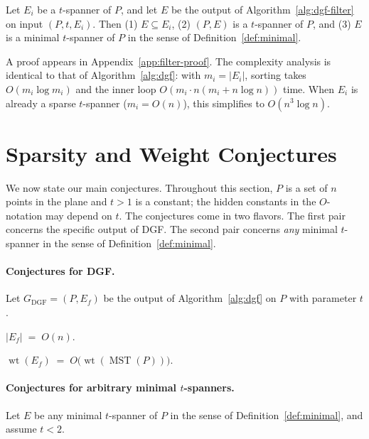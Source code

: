 \documentclass{cccg26}
\DeclareMathOperator{\wt}{wt}
\DeclareMathOperator{\MST}{MST}
\begin{document}
\begin{theorem}\label{thm:filter-minimal}
Let $E_i$ be a $t$-spanner of $P$, and let $E$ be the output of
Algorithm~\ref{alg:dgf-filter} on input $(P,t,E_i)$. Then
(1) $E \subseteq E_i$, (2) $(P,E)$ is a $t$-spanner of $P$, and
(3) $E$ is a minimal $t$-spanner of $P$ in the sense of
Definition~\ref{def:minimal}.
\end{theorem}

A proof appears in Appendix~\ref{app:filter-proof}. The complexity
analysis is identical to that of Algorithm~\ref{alg:dgf}: with
$m_i=|E_i|$, sorting takes $O(m_i\log m_i)$ and the inner loop
$O(m_i\cdot n(m_i+n\log n))$ time. When $E_i$ is already a sparse
$t$-spanner ($m_i=O(n)$), this simplifies to $O(n^3 \log n)$.

\section{Sparsity and Weight Conjectures}
\label{sec:conjectures}

We now state our main conjectures. Throughout this section, $P$ is a
set of $n$ points in the plane and $t>1$ is a constant; the hidden
constants in the $O$-notation may depend on $t$. The conjectures come
in two flavors. The first pair concerns the specific output of DGF.
The second pair concerns \emph{any} minimal $t$-spanner in the sense
of Definition~\ref{def:minimal}.

\paragraph{Conjectures for DGF.}
Let $G_{\mathrm{DGF}}=(P,E_f)$ be the output of Algorithm~\ref{alg:dgf}
on $P$ with parameter $t$.

\begin{conj}\label{conj:dgf-edges}
$|E_f| \;=\; O(n)$.
\end{conj}

\begin{conj}\label{conj:dgf-weight}
$\wt(E_f) \;=\; O\!\bigl(\wt(\MST(P))\bigr)$.
\end{conj}

\paragraph{Conjectures for arbitrary minimal $t$-spanners.}
Let $E$ be any minimal $t$-spanner of $P$ in the sense of
Definition~\ref{def:minimal}, and assume $t < 2$.
\end{document}
